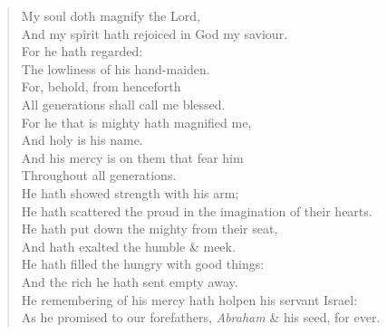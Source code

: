 \documentclass[MAIN]{subfiles}
\begin{document}
\begin{verse}
My soul doth magnify the Lord,\\
\vin And my spirit hath rejoiced in God my saviour.\\
For he hath regarded:\\
\vin The lowliness of his hand-maiden.\\
For, behold, from henceforth\\
\vin All generations shall call me blessed.\\
For he that is mighty hath magnified me,\\
\vin And holy is his name.\\
And his mercy is on them that fear him\\
\vin Throughout all generations.\\
He hath showed strength with his arm;\\
\vin He hath scattered the proud in the imagination of their hearts.\\
He hath put down the mighty from their seat,\\
\vin And hath exalted the humble \& meek.\\
He hath filled the hungry with good things:\\
\vin And the rich he hath sent empty away.\\
He remembering of his mercy hath holpen his servant Israel:\\
\vin As he promised to our forefathers, \emph{Abraham} \& his seed, for ever.
\end{verse}
\end{document}

